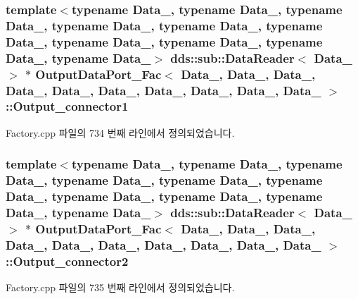 \subsubsection[{\texorpdfstring{Output\+\_\+connector1}{Output_connector1}}]{\setlength{\rightskip}{0pt plus 5cm}template$<$typename Data\+\_, typename Data\+\_, typename Data\+\_, typename Data\+\_, typename Data\+\_, typename Data\+\_, typename Data\+\_, typename Data\+\_, typename Data\+\_, typename Data\+\_$>$ dds\+::sub\+::\+Data\+Reader$<$ Data\+\_ $>$ $\ast$ {\bf Output\+Data\+Port\+\_\+\+Fac}$<$ Data\+\_, Data\+\_, Data\+\_, Data\+\_, Data\+\_, Data\+\_, Data\+\_, Data\+\_, Data\+\_, Data\+\_ $>$\+::Output\+\_\+connector1}\hypertarget{classOutputDataPort__Fac_a9c7324b8997072b5431910321d6d7c3b}{}\label{classOutputDataPort__Fac_a9c7324b8997072b5431910321d6d7c3b}


Factory.\+cpp 파일의 734 번째 라인에서 정의되었습니다.

\subsubsection[{\texorpdfstring{Output\+\_\+connector2}{Output_connector2}}]{\setlength{\rightskip}{0pt plus 5cm}template$<$typename Data\+\_, typename Data\+\_, typename Data\+\_, typename Data\+\_, typename Data\+\_, typename Data\+\_, typename Data\+\_, typename Data\+\_, typename Data\+\_, typename Data\+\_$>$ dds\+::sub\+::\+Data\+Reader$<$ Data\+\_ $>$ $\ast$ {\bf Output\+Data\+Port\+\_\+\+Fac}$<$ Data\+\_, Data\+\_, Data\+\_, Data\+\_, Data\+\_, Data\+\_, Data\+\_, Data\+\_, Data\+\_, Data\+\_ $>$\+::Output\+\_\+connector2}\hypertarget{classOutputDataPort__Fac_aa855af59d69d03b63b8bfd2c9e382e43}{}\label{classOutputDataPort__Fac_aa855af59d69d03b63b8bfd2c9e382e43}


Factory.\+cpp 파일의 735 번째 라인에서 정의되었습니다.

